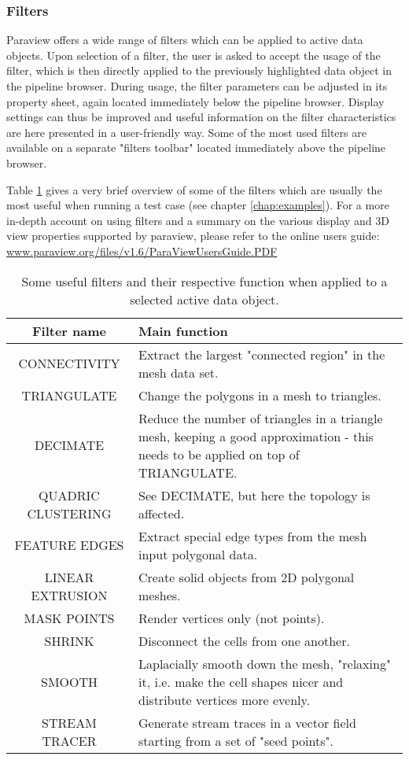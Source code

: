 \subsubsection{Filters}

Paraview offers a wide range of filters which can be applied to active data objects. Upon selection of a filter, the user is asked to accept the usage of the filter, which is then directly applied to the previously highlighted data object in the pipeline browser. During usage, the filter parameters can be adjusted in its property sheet, again located immediately below the pipeline browser. Display settings can thus be improved and useful information on the filter characteristics are here presented in a user-friendly way. Some of the most used filters are available on a separate "filters toolbar" located immediately above the pipeline browser.

Table \ref{ParaviewFilters} gives a very brief overview of some of the filters which are usually the most useful when running a test case (see chapter \ref{chap:examples}). For a more in-depth account on using filters and a summary on the various display and 3D view properties supported by paraview, please refer to the online users guide:
\url{www.paraview.org/files/v1.6/ParaViewUsersGuide.PDF}

\begin{center}
\begin{table}[h!]
\begin{tabular}{cp{110mm}}
{\bfseries Filter name} & {\bfseries\centering Main function} \\
\hline
CONNECTIVITY & Extract the largest "connected region" in the mesh data set. \\
TRIANGULATE & Change the polygons in a mesh to triangles. \\
DECIMATE & Reduce the number of triangles in a triangle mesh, keeping a good approximation - this needs to be applied on top of TRIANGULATE. \\
QUADRIC CLUSTERING & See DECIMATE, but here the topology is affected. \\
FEATURE EDGES & Extract special edge types from the mesh input polygonal data. \\
LINEAR EXTRUSION & Create solid objects from 2D polygonal meshes. \\
MASK POINTS & Render vertices only (not points). \\
SHRINK & Disconnect the cells from one another. \\
SMOOTH & Laplacially smooth down the mesh, "relaxing" it, i.e. make the cell shapes nicer and distribute vertices more evenly. \\
STREAM TRACER & Generate stream traces in a vector field starting from a set of "seed points". \\
\end{tabular}
\label{ParaviewFilters}
\caption{Some useful filters and their respective function when applied to a selected active data object.}
\end{table}
\end{center}

